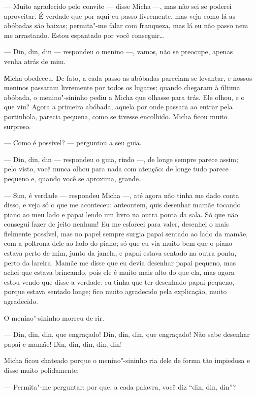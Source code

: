 --- Muito agradecido pelo convite --- disse Micha ---, mas não sei se
poderei aproveitar. É verdade que por aqui eu passo livremente, mas veja como lá as abóbadas são baixas; permita"-me falar com
franqueza, mas lá eu não passo nem me arrastando. Estou espantado por
você conseguir\ldots{}

--- Din, din, din --- respondeu o menino ---, vamos, não se preocupe,
apenas venha atrás de mim.

Мicha obedeceu. De fato, a cada passo as abóbadas pareciam se levantar,
e nossos meninos passaram livremente por todos os lugares; quando
chegaram à última abóbada, o menino"-sininho pediu a Micha que olhasse
para trás. Ele olhou, e o que viu? Agora a primeira abóbada, aquela por
onde passara ao entrar pela portinhola, parecia pequena, como se tivesse
encolhido. Micha ficou muito surpreso.

--- Como é possível? --- perguntou a seu guia.

--- Din, din, din --- respondeu o guia, rindo ---, de longe sempre
parece assim; pelo visto, você nunca olhou para nada com atenção: de
longe tudo parece pequeno e, quando você se aproxima, grande.

--- Sim, é verdade --- respondeu Micha ---, até agora não tinha me dado
conta disso, e veja só o que me aconteceu: anteontem, quis desenhar
mamãe tocando piano ao meu lado e papai lendo um livro na outra ponta da
sala. Só que não consegui fazer de jeito nenhum! Eu me esforcei para
valer, desenhei o mais fielmente possível, mas no papel sempre surgia
papai sentado ao lado da mamãe, com a poltrona dele ao lado do piano; só
que eu via muito bem que o piano estava perto de mim, junto da janela, e
papai estava sentado na outra ponta, perto da lareira. Mamãe me disse
que eu devia desenhar papai pequeno, mas achei que estava brincando,
pois ele é muito mais alto do que ela, mas agora estou vendo que disse a
verdade: eu tinha que ter desenhado papai pequeno, porque estava sentado
longe; fico muito agradecido pela explicação, muito agradecido.

O menino"-sininho morreu de rir.

--- Din, din, din, que engraçado! Din, din, din, que engraçado! Não sabe
desenhar papai e mamãe! Din, din, din, din, din!

Micha ficou chateado porque o menino"-sininho ria dele de forma tão
impiedosa e disse muito polidamente:

--- Permita"-me perguntar: por que, a cada palavra, você diz ``din, din,
din''?

